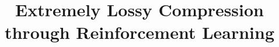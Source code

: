 \documentclass[11pt]{article}
\title{Extremely Lossy Compression through Reinforcement Learning}
\author{\theteam}
\begin{document}
\maketitle

\begin{multicols*}{2}




    
\end{multicols*}



\end{document}
